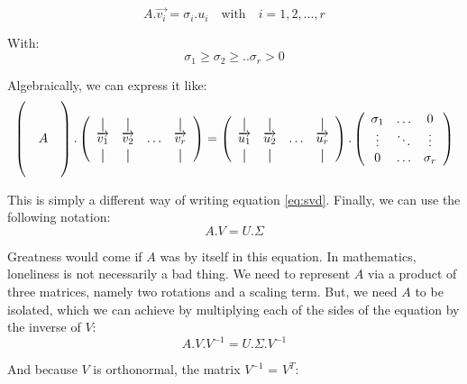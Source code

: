 \documentclass[a4,12pt,twosided,openany]{memoir}
\begin{document}
\begin{equation} \label{eq:svd}
 A.\overrightarrow{v_i} = \sigma_i. u_i  \quad \textrm{with}  \quad i = 1,2,...,r
\end{equation}
\par 
\indent
With:
\[ \sigma_1 \geq \sigma_2 \geq .. \sigma_r > 0 \]
\par 
\indent
Algebraically, we can express it like:
\[\begin{pmatrix}
  \\
 & &  \\
 & A  \\
 & &  \\
  \\
\end{pmatrix} . 
\left(
  \begin{array}{cccc}
    \vertbar & \vertbar &        & \vertbar \\
  \overrightarrow{v_1}    &    \overrightarrow{v_2}    & \ldots &\overrightarrow{v_r}     \\
    \vertbar & \vertbar &        & \vertbar 
  \end{array}
\right) = 
\left(
  \begin{array}{cccc}
    \vertbar & \vertbar &        & \vertbar \\
  \overrightarrow{u_1}    &    \overrightarrow{u_2}    & \ldots &\overrightarrow{u_r}     \\
    \vertbar & \vertbar &        & \vertbar 
  \end{array}
\right).
\left(
  \begin{array}{cccc}
    \sigma_1 & \hdots & 0 \\
     \vdots   &    \ddots    & \vdots    \\
    0 & \hdots &    \sigma_r  \\
  \end{array}
\right)
\]
\par 
\indent
This is simply a different way of writing equation \ref{eq:svd}. Finally, we can use the following notation:
\[A.V = U.\Sigma \]
\par 
\indent
Greatness would come if $A$  was by itself in this equation. In mathematics, loneliness is not necessarily a bad thing. We need to represent $A$ via a product of three matrices, namely two rotations and a scaling term. But, we need $A$ to be isolated, which we can achieve by multiplying each of the sides of the equation by the inverse of $V$:
\[A.V.V^{-1}=U.\Sigma.V^{-1}\]
\par 
\indent
And because $V$ is orthonormal, the matrix $V^{-1}$ = $V^T$:
\end{document}
